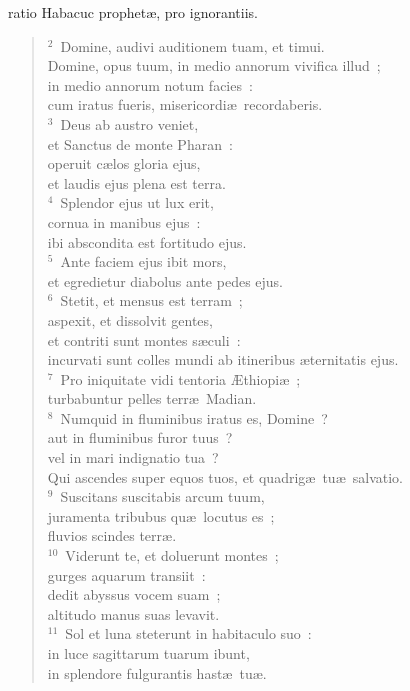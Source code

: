 \bchapter
{}ratio Habacuc prophet\ae , pro ignorantiis.


\begin{verse}${}^{2}$~Domine, audivi auditionem tuam, et timui.\\ Domine, opus tuum, in medio annorum vivifica illud~;\\ in medio annorum notum facies~:\\ cum iratus fueris, misericordi\ae\ recordaberis.\\
${}^{3}$~Deus ab austro veniet,\\ et Sanctus de monte Pharan~:\\ operuit c\ae los gloria ejus,\\ et laudis ejus plena est terra.\\
${}^{4}$~Splendor ejus ut lux erit,\\ cornua in manibus ejus~:\\ ibi abscondita est fortitudo ejus.\\
${}^{5}$~Ante faciem ejus ibit mors,\\ et egredietur diabolus ante pedes ejus.\\
${}^{6}$~Stetit, et mensus est terram~;\\ aspexit, et dissolvit gentes,\\ et contriti sunt montes s\ae culi~:\\ incurvati sunt colles mundi ab itineribus \ae ternitatis ejus.\\
${}^{7}$~Pro iniquitate vidi tentoria \AE thiopi\ae~;\\ turbabuntur pelles terr\ae\ Madian.\\
${}^{8}$~Numquid in fluminibus iratus es, Domine~?\\ aut in fluminibus furor tuus~?\\ vel in mari indignatio tua~?\\ Qui ascendes super equos tuos, et quadrig\ae\ tu\ae\ salvatio.\\
${}^{9}$~Suscitans suscitabis arcum tuum,\\ juramenta tribubus qu\ae\ locutus es~;\\ fluvios scindes terr\ae .\\
${}^{10}$~Viderunt te, et doluerunt montes~;\\ gurges aquarum transiit~:\\ dedit abyssus vocem suam~;\\ altitudo manus suas levavit.\\
${}^{11}$~Sol et luna steterunt in habitaculo suo~:\\ in luce sagittarum tuarum ibunt,\\ in splendore fulgurantis hast\ae\ tu\ae .\\

\end{verse}
